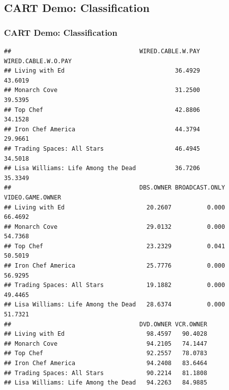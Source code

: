 \documentclass[
  shownotes,
  xcolor={svgnames},
  hyperref={colorlinks,citecolor=DarkBlue,linkcolor=DarkRed,urlcolor=DarkBlue}
  ]{beamer}
\newenvironment{Shaded}{\begin{snugshade}}{\end{snugshade}}
\newcommand{\CommentTok}[1]{\textcolor[rgb]{0.56,0.35,0.01}{\textit{#1}}}
\newcommand{\DataTypeTok}[1]{\textcolor[rgb]{0.13,0.29,0.53}{#1}}
\newcommand{\DecValTok}[1]{\textcolor[rgb]{0.00,0.00,0.81}{#1}}
\newcommand{\KeywordTok}[1]{\textcolor[rgb]{0.13,0.29,0.53}{\textbf{#1}}}
\newcommand{\NormalTok}[1]{#1}
\newcommand{\OperatorTok}[1]{\textcolor[rgb]{0.81,0.36,0.00}{\textbf{#1}}}
\newcommand{\StringTok}[1]{\textcolor[rgb]{0.31,0.60,0.02}{#1}}
\begin{document}
\subsection{CART Demo: Classification}
\begin{frame}[fragile]
\frametitle{CART Demo: Classification}


\begin{scriptsize}
\begin{Shaded}
\end{Shaded}
\end{scriptsize}

\begin{tiny}
\begin{verbatim}
##                                    WIRED.CABLE.W.PAY WIRED.CABLE.W.O.PAY
## Living with Ed                               36.4929             43.6019
## Monarch Cove                                 31.2500             39.5395
## Top Chef                                     42.8806             34.1528
## Iron Chef America                            44.3794             29.9661
## Trading Spaces: All Stars                    46.4945             34.5018
## Lisa Williams: Life Among the Dead           36.7206             35.3349
##                                    DBS.OWNER BROADCAST.ONLY VIDEO.GAME.OWNER
## Living with Ed                       20.2607          0.000          66.4692
## Monarch Cove                         29.0132          0.000          54.7368
## Top Chef                             23.2329          0.041          50.5019
## Iron Chef America                    25.7776          0.000          56.9295
## Trading Spaces: All Stars            19.1882          0.000          49.4465
## Lisa Williams: Life Among the Dead   28.6374          0.000          51.7321
##                                    DVD.OWNER VCR.OWNER
## Living with Ed                       98.4597   90.4028
## Monarch Cove                         94.2105   74.1447
## Top Chef                             92.2557   78.0783
## Iron Chef America                    94.2408   83.6464
## Trading Spaces: All Stars            90.2214   81.1808
## Lisa Williams: Life Among the Dead   94.2263   84.9885
\end{verbatim}
\end{tiny}

\end{frame}
\end{document}
